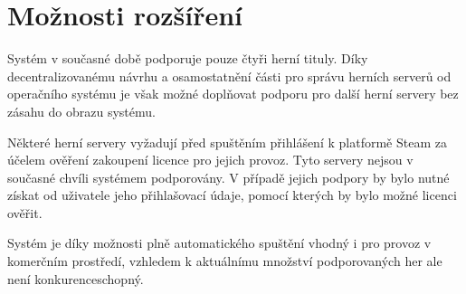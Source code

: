 \section{Možnosti rozšíření}

Systém v současné době podporuje pouze čtyři herní tituly. Díky decentralizovanému návrhu
a osamostatnění části pro správu herních serverů od operačního systému je však možné doplňovat podporu
pro další herní servery bez zásahu do obrazu systému.

Některé herní servery vyžadují před spuštěním přihlášení k platformě Steam za účelem ověření zakoupení licence
pro jejich provoz. Tyto servery nejsou v současné chvíli systémem podporovány. V případě jejich podpory
by bylo nutné získat od uživatele jeho přihlašovací údaje, pomocí kterých by bylo možné licenci ověřit.

Systém je díky možnosti plně automatického spuštění vhodný i pro provoz v komerčním prostředí, vzhledem k aktuálnímu
množství podporovaných her ale není konkurenceschopný.